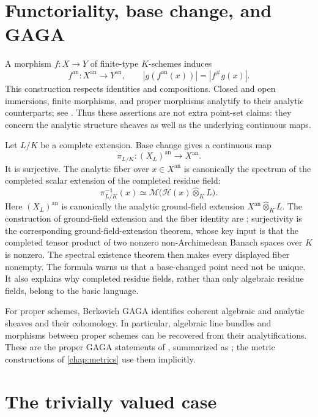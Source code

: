 \section{Functoriality, base change, and GAGA}
\label{sec:berk-functoriality}

A morphism $f:X\to Y$ of finite-type $K$-schemes induces
\[
 f^{\mathrm{an}}:X^{\mathrm{an}}\longrightarrow Y^{\mathrm{an}},
 \qquad
 |g(f^{\mathrm{an}}(x))|=|f^\#g(x)|.
\]
This construction respects identities and compositions. Closed and open
immersions, finite morphisms, and proper morphisms analytify to their
analytic counterparts; see
\cite[Fact~5.1.2.1]{Temkin2015Berkovich}.  Thus these assertions are not
extra point-set claims: they concern the analytic structure sheaves as
well as the underlying continuous maps.

Let $L/K$ be a complete extension. Base change gives a continuous map
\[
 \pi_{L/K}:(X_L)^{\mathrm{an}}\longrightarrow X^{\mathrm{an}}.
\]
It is surjective. The analytic fiber over $x\in X^{\mathrm{an}}$ is
canonically the spectrum of the completed scalar extension of the completed
residue field:
\[
              \pi_{L/K}^{-1}(x)\simeq
              \mathcal M\bigl(\mathcal H(x)\widehat\otimes_K L\bigr).
\]
Here $(X_L)^{\mathrm{an}}$ is canonically the analytic ground-field
extension $X^{\mathrm{an}}\widehat\otimes_KL$.  The construction of
ground-field extension and the fiber identity are
\cite[Definition/Exercise~4.1.7.1]{Temkin2015Berkovich}; surjectivity is
the corresponding ground-field-extension theorem, whose key input is that
the completed tensor product of two nonzero non-Archimedean Banach spaces
over $K$ is nonzero.  The spectral existence theorem
\cite[Theorem~1.2.1]{Berk12} then makes every displayed fiber nonempty.
The formula warns us that a base-changed point need not be unique. It also
explains why completed residue fields, rather than only algebraic residue
fields, belong to the basic language.

For proper schemes, Berkovich GAGA identifies coherent algebraic and
analytic sheaves and their cohomology. In particular, algebraic line
bundles and morphisms between proper schemes can be recovered from their
analytifications.  These are the proper GAGA statements of
\cite[\S\S3.4--3.5]{Berk12}, summarized as
\cite[Facts~5.1.2.1--5.1.2.4]{Temkin2015Berkovich}; the metric
constructions of \cref{chap:metrics} use them implicitly.

\section{The trivially valued case}
\label{sec:berk-trivial}

